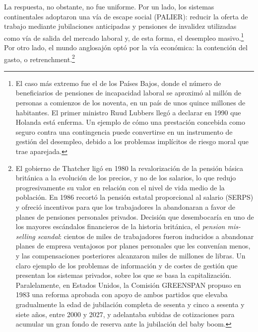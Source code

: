 \documentclass[10pt,a4paper]{article}
\begin{document}
La respuesta, no obstante, no fue uniforme. Por un lado, los sistemas continentales adoptaron una vía de escape social (PALIER): reducir la oferta de trabajo mediante jubilaciones anticipadas y pensiones de invalidez utilizadas como vía de salida del mercado laboral y, de esta forma, el desempleo masivo.\footnote{%
    El caso más extremo fue el de los Países Bajos, donde el número de beneficiarios de pensiones de incapacidad laboral se aproximó al millón de personas a comienzos de los noventa, en un país de unos quince millones de habitantes. El primer ministro Ruud Lubbers llegó a declarar en 1990 que Holanda está enferma. Un ejemplo de cómo una prestación concebida como seguro contra una contingencia puede convertirse en un instrumento de gestión del desempleo, debido a los problemas implícitos de riesgo moral que trae aparejada.
} Por otro lado, el mundo anglosajón optó por la vía económica: la contención del gasto, o retrenchment.\footnote{%
    El gobierno de Thatcher ligó en 1980 la revalorización de la pensión básica británica a la evolución de los precios, y no de los salarios, lo que redujo progresivamente su valor en relación con el nivel de vida medio de la población. En 1986 recortó la pensión estatal proporcional al salario (SERPS) y ofreció incentivos para que los trabajadores la abandonaran a favor de planes de pensiones personales privados. Decisión que desembocaría en uno de los mayores escándalos financieros de la historia británica, el \textit{pension mis-selling scandal}: cientos de miles de trabajadores fueron inducidos a abandonar planes de empresa ventajosos por planes personales que les convenían menos, y las compensaciones posteriores alcanzaron miles de millones de libras. Un claro ejemplo de los problemas de información y de costes de gestión que presentan los sistemas privados, sobre los que se basa la capitalización. Paralelamente, en Estados Unidos, la Comisión GREENSPAN propuso en 1983 una reforma aprobada con apoyo de ambos partidos que elevaba gradualmente la edad de jubilación completa de sesenta y cinco a sesenta y siete años, entre 2000 y 2027, y adelantaba subidas de cotizaciones para acumular un gran fondo de reserva ante la jubilación del baby boom.
}
\end{document}

